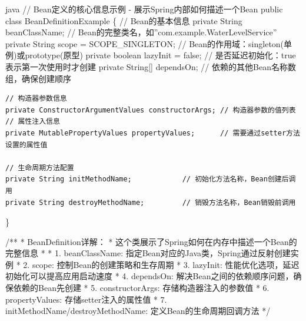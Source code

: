 java // Bean定义的核心信息示例 - 展示Spring内部如何描述一个Bean public class BeanDefinitionExample \{ // Bean的基本信息 private String beanClassName; // Bean的完整类名，如''com.example.WaterLevelService'' private String scope = SCOPE\_SINGLETON; // Bean的作用域：singleton(单例)或prototype(原型) private boolean lazyInit = false; // 是否延迟初始化：true表示第一次使用时才创建 private String{[}{]} dependsOn; // 依赖的其他Bean名称数组，确保创建顺序

\begin{verbatim}
// 构造器参数信息
private ConstructorArgumentValues constructorArgs; // 构造器参数的值列表
// 属性注入信息  
private MutablePropertyValues propertyValues;      // 需要通过setter方法设置的属性值

// 生命周期方法配置
private String initMethodName;            // 初始化方法名称，Bean创建后调用
private String destroyMethodName;         // 销毁方法名称，Bean销毁前调用
\end{verbatim}

\}

/** * BeanDefinition详解： * 这个类展示了Spring如何在内存中描述一个Bean的完整信息 * * 1. beanClassName: 指定Bean对应的Java类，Spring通过反射创建实例 * 2. scope: 控制Bean的创建策略和生存周期 * 3. lazyInit: 性能优化选项，延迟初始化可以提高应用启动速度 * 4. dependsOn: 解决Bean之间的依赖顺序问题，确保依赖的Bean先创建 * 5. constructorArgs: 存储构造器注入的参数值 * 6. propertyValues: 存储setter注入的属性值 * 7. initMethodName/destroyMethodName: 定义Bean的生命周期回调方法 */

